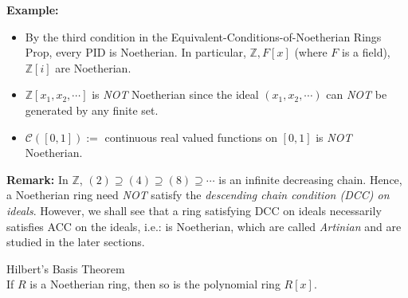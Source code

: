 \noindent\textbf{Example:} \begin{itemize}
    \item By the third condition in the Equivalent-Conditions-of-Noetherian Rings Prop, every PID is Noetherian. In particular, $\mathbb{Z},F[x]$ (where $F$ is a field), $\mathbb{Z}[i]$ are Noetherian.

    \item $\mathbb{Z} [x_1 ,x_2 ,\cdots]$ is \textit{NOT} Noetherian since the ideal $(x_1 ,x_2 ,\cdots)$ can \textit{NOT} be generated by any finite set.

    \item $\mathcal{C} ([0,1]) :=$ continuous real valued functions on $[0,1]$ is \textit{NOT} Noetherian.
\end{itemize}

\noindent\textbf{Remark:} In $\mathbb{Z}$, $(2) \supseteq (4) \supseteq (8) \supseteq \cdots$ is an infinite decreasing chain. Hence, a Noetherian ring need \textit{NOT} satisfy the \textit{descending chain condition (DCC) on ideals}. However, we shall see that a ring satisfying DCC on ideals necessarily satisfies ACC on the ideals, i.e.: is Noetherian, which are called \textit{Artinian} and are studied in the later sections.

\begin{theorem}{Hilbert's Basis Theorem}\\
If $R$ is a Noetherian ring, then so is the polynomial ring $R[x]$.
\end{theorem}

